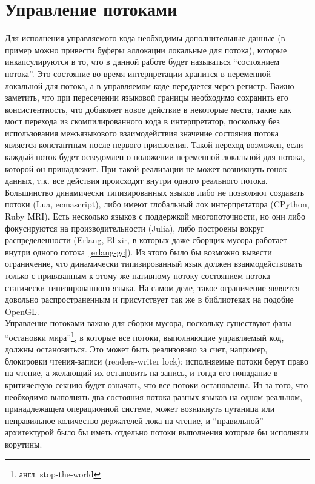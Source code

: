 \documentclass[times,specification,annotation]{itmo-student-thesis}
\begin{document}
\section{Управление потоками} \label{sec:thread-management}
Для исполнения управляемого кода необходимы дополнительные данные (в пример можно привести буферы аллокации локальные для потока), которые инкапсулируются в то, что в данной работе будет называться ``состоянием потока''. Это состояние во время интерпретации хранится в переменной локальной для потока, а в управляемом коде передается через регистр. Важно заметить, что при пересечении языковой границы необходимо сохранить его консистентность, что добавляет новое действие в некоторые места, такие как мост перехода из скомпилированного кода в интерпретатор, поскольку без использования межъязыкового взаимодействия значение состояния потока является константным после первого присвоения. Такой переход возможен, если каждый поток будет осведомлен о положении переменной локальной для потока, которой он принадлежит. При такой реализации не может возникнуть гонок данных, т.к. все действия происходят внутри одного реального потока.\\

Большинство динамически типизированных языков либо не позволяют создавать потоки (Lua, ecmascript), либо имеют глобальный лок интерпретатора (CPython, Ruby MRI). Есть несколько языков с поддержкой многопоточности, но они либо фокусируются на производительности (Julia), либо построены вокруг распределенности (Erlang, Elixir, в которых даже сборщик мусора работает внутри одного потока~\ref{erlang-gc}). Из этого было бы возможно вывести ограничение, что динамически типизированный язык должен взаимодействовать только с привязанным к этому же нативному потоку состоянием потока статически типизированного языка. На самом деле, такое ограничение является довольно распространенным и присутствует так же в библиотеках на подобие OpenGL.\\
Управление потоками важно для сборки мусора, поскольку существуют фазы ``остановки мира''\footnote{англ. stop-the-world}, в которые все потоки, выполняющие управляемый код, должны остановиться. Это может быть реализовано за счет, например, блокировки чтения-записи (readers-writer lock): исполняемые потоки берут право на чтение, а желающий их остановить на запись, и тогда его попадание в критическую секцию будет означать, что все потоки остановлены. Из-за того, что необходимо выполнять два состояния потока разных языков на одном реальном, принадлежащем операционной системе, может возникнуть путаница или неправильное количество держателей лока на чтение, и ``правильной'' архитектурой было бы иметь отдельно потоки выполнения которые бы исполняли корутины.
\end{document}
